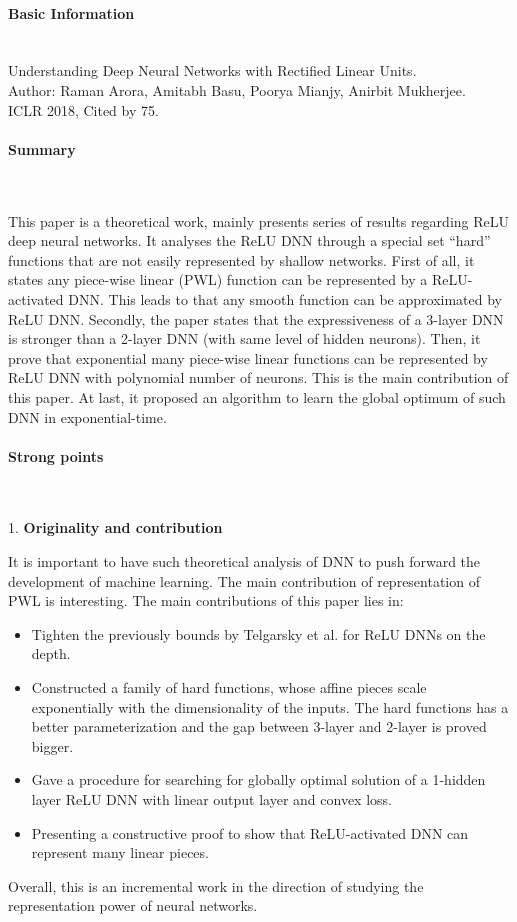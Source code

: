 \documentclass{article}
\begin{document}
\thispagestyle{empty}

\paragraph{Basic Information}  \ \\
Understanding Deep Neural Networks with Rectified Linear Units. \\
Author: Raman Arora, Amitabh Basu, Poorya Mianjy, Anirbit Mukherjee. \\
ICLR 2018, Cited by 75.

\paragraph{Summary}  \  

This paper is a theoretical work, mainly presents series of results regarding ReLU deep neural networks. It analyses the ReLU DNN through a special set ``hard'' functions that are not easily represented by shallow networks. First of all, it states any piece-wise linear (PWL) function can be represented by a ReLU-activated DNN. This leads to that any smooth function can be approximated by ReLU DNN. Secondly, the paper states that the expressiveness of a 3-layer DNN is stronger than a 2-layer DNN (with same level of hidden neurons). Then, it prove that exponential many piece-wise linear functions can be represented by ReLU DNN with polynomial number of neurons. This is the main contribution of this paper. At last, it proposed an algorithm to learn the global optimum of such DNN in exponential-time.

\paragraph{Strong points}  \  

1. \textbf{Originality and contribution}   

It is important to have such theoretical analysis of DNN to push forward the development of machine learning. The main contribution of representation of PWL is interesting. The main contributions of this paper lies in:
\begin{itemize}
\item Tighten the previously bounds by Telgarsky et al. for ReLU DNNs on the depth.
\item Constructed a family of hard functions, whose affine pieces scale exponentially with the dimensionality of the inputs. The hard functions has a better parameterization and the gap between 3-layer and 2-layer is proved bigger.
\item Gave a procedure for searching for globally optimal solution of a 1-hidden layer ReLU DNN with linear output layer and convex loss. 
\item Presenting a constructive proof to show that ReLU-activated DNN can represent many linear pieces. 
\end{itemize}
Overall, this is an incremental work in the direction of studying the representation power of neural networks.
\end{document}

